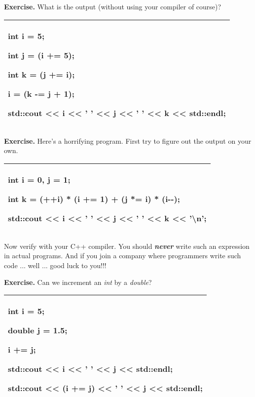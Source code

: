\documentclass[
]{article}
\begin{document}
\textbf{Exercise. }What is the output (without using your compiler of
course)?

\begin{longtable}[]{@{}l@{}}
\toprule
\endhead
\begin{minipage}[t]{0.97\columnwidth}\raggedright
int i = 5;

int j = (i += 5);

int k = (j += i);

i = (k -= j + 1);

std::cout \textless\textless{} i \textless\textless{} ' '
\textless\textless{} j \textless\textless{} ' ' \textless\textless{} k
\textless\textless{} std::endl;\strut
\end{minipage}\tabularnewline
\bottomrule
\end{longtable}

\textbf{Exercise.} Here's a horrifying program. First try to figure out
the output on your own.

\begin{longtable}[]{@{}l@{}}
\toprule
\endhead
\begin{minipage}[t]{0.97\columnwidth}\raggedright
int i = 0, j = 1;

int k = (++i) * (i += 1) + (j *= i) * (i-\/-);

std::cout \textless\textless{} i \textless\textless{} ' '
\textless\textless{} j \textless\textless{} ' ' \textless\textless{} k
\textless\textless{} '\textbackslash n';\strut
\end{minipage}\tabularnewline
\bottomrule
\end{longtable}

Now verify with your C++ compiler. You should \emph{\textbf{never}}
write such an expression in actual programs. And if you join a company
where programmers write such code ... well ... good luck to you!!!

\textbf{Exercise.} Can we increment an \emph{int} by a \emph{double}?

\begin{longtable}[]{@{}l@{}}
\toprule
\endhead
\begin{minipage}[t]{0.97\columnwidth}\raggedright
int i = 5;

double j = 1.5;

i += j;

std::cout \textless\textless{} i \textless\textless{} ' '
\textless\textless{} j \textless\textless{} std::endl;

std::cout \textless\textless{} (i += j) \textless\textless{} ' '
\textless\textless{} j \textless\textless{} std::endl;\strut
\end{minipage}\tabularnewline
\bottomrule
\end{longtable}
\end{document}
